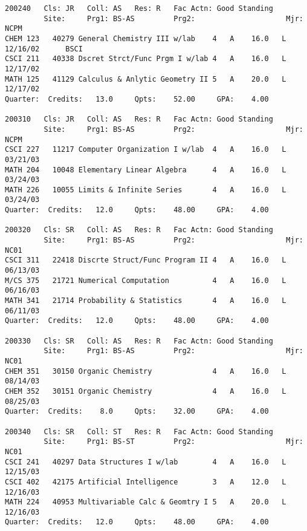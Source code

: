 \documentclass[line]{res}
\begin{document}
\begin{resume}
\begin{verbatim}
200240   Cls: JR   Coll: AS   Res: R   Fac Actn: Good Standing    
         Site:     Prg1: BS-AS         Prg2:                     Mjr: NCPM
CHEM 123   40279 General Chemistry III w/lab    4   A    16.0   L  12/16/02      BSCI                
CSCI 211   40338 Dscret Strct/Func Prgm I w/lab 4   A    16.0   L  12/17/02                          
MATH 125   41129 Calculus & Anlytic Geometry II 5   A    20.0   L  12/17/02                          
Quarter:  Credits:   13.0     Qpts:    52.00     GPA:    4.00
                                                                                
200310   Cls: JR   Coll: AS   Res: R   Fac Actn: Good Standing    
         Site:     Prg1: BS-AS         Prg2:                     Mjr: NCPM
CSCI 227   11217 Computer Organization I w/lab  4   A    16.0   L  03/21/03                          
MATH 204   10048 Elementary Linear Algebra      4   A    16.0   L  03/24/03                          
MATH 226   10055 Limits & Infinite Series       4   A    16.0   L  03/24/03                          
Quarter:  Credits:   12.0     Qpts:    48.00     GPA:    4.00
                                                                                
200320   Cls: SR   Coll: AS   Res: R   Fac Actn: Good Standing    
         Site:     Prg1: BS-AS         Prg2:                     Mjr: NC01
CSCI 311   22418 Discrte Struct/Func Program II 4   A    16.0   L  06/13/03                          
M/CS 375   21721 Numerical Computation          4   A    16.0   L  06/16/03                          
MATH 341   21714 Probability & Statistics       4   A    16.0   L  06/11/03                          
Quarter:  Credits:   12.0     Qpts:    48.00     GPA:    4.00
                                                                                
200330   Cls: SR   Coll: AS   Res: R   Fac Actn: Good Standing    
         Site:     Prg1: BS-AS         Prg2:                     Mjr: NC01
CHEM 351   30150 Organic Chemistry              4   A    16.0   L  08/14/03                          
CHEM 352   30151 Organic Chemistry              4   A    16.0   L  08/25/03                          
Quarter:  Credits:    8.0     Qpts:    32.00     GPA:    4.00
                                                                                
200340   Cls: SR   Coll: ST   Res: R   Fac Actn: Good Standing    
         Site:     Prg1: BS-ST         Prg2:                     Mjr: NC01
CSCI 241   40297 Data Structures I w/lab        4   A    16.0   L  12/15/03                          
CSCI 402   42175 Artificial Intelligence        3   A    12.0   L  12/16/03                          
MATH 224   40953 Multivariable Calc & Geomtry I 5   A    20.0   L  12/16/03                          
Quarter:  Credits:   12.0     Qpts:    48.00     GPA:    4.00
                                                                                

\end{verbatim}
\end{resume}
\end{document}
